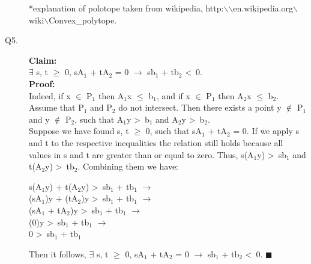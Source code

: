 \documentclass[10pt]{csc_assignment}
\begin{document}
\begin{description}
\tiny{*explanation of polotope taken from wikipedia, http:$\backslash$$\backslash$en.wikipedia.org$\backslash$wiki$\backslash$Convex\_polytope.}\\
\normalsize{}

\newpage
\item[Q5.]
\textbf{Claim:} \\$\exists$ s, t $\geqslant$ 0, sA$_{1}$ + tA$_{2}$ = 0 $\rightarrow$
sb$_{1}$ + tb$_{2}$ \textless ~0.\\
\textbf{Proof:} \\Indeed, if x $\in$ P$_{1}$ then A$_{1}$x $\leqslant$ b$_{1}$, and if x $\in$ P$_{1}$ then A$_{2}$x $\leqslant$ b$_{2}$. Assume that P$_{1}$ and P$_{2}$ do not intersect. Then there exists a point y $\notin$ P$_{1}$ and y $\notin$ P$_{2}$, such that A$_{1}$y \textgreater ~b$_{1}$ and A$_{2}$y \textgreater ~b$_{2}$.\\

Suppose we have found s, t $\geqslant$ 0, such that sA$_{1}$ + tA$_{2}$ = 0. If we apply
s and t to the respective inequalities the relation still holds because all values in s and t are greater than or equal to zero. Thus, s(A$_{1}$y) \textgreater ~sb$_{1}$ and t(A$_{2}$y) \textgreater ~tb$_{2}$. Combining them we have:\\
\hspace*{1cm}\parbox{16cm}{s(A$_{1}$y) + t(A$_{2}$y) \textgreater ~sb$_{1}$ + tb$_{1}$ $\rightarrow$\\
(sA$_{1}$)y + (tA$_{2}$)y \textgreater ~sb$_{1}$ + tb$_{1}$ $\rightarrow$\\
(sA$_{1}$ + tA$_{2}$)y \textgreater ~sb$_{1}$ + tb$_{1}$ $\rightarrow$\\
(0)y \textgreater ~sb$_{1}$ + tb$_{1}$ $\rightarrow$\\
0 \textgreater ~sb$_{1}$ + tb$_{1}$\\
}
Then it follows, $\exists$ s, t $\geqslant$ 0, sA$_{1}$ + tA$_{2}$ = 0 $\rightarrow$
sb$_{1}$ + tb$_{2}$ \textless ~0. $\blacksquare$\\


\end{description}
\end{document}
